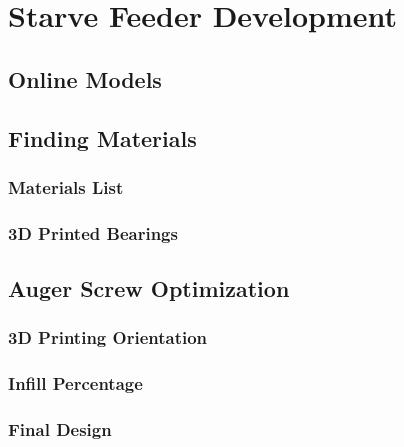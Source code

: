 \section{Starve Feeder Development\label{methedology:starveFeeder}}

\subsection{Online Models\label{sec:methedology:starveFeeder:onlineModels}}

\subsection{Finding Materials\label{sec:methedology:starveFeeder:findingMaterials}}

\subsubsection{Materials List\label{sec:methedology:starveFeeder:findingMaterials:materialsList}}

\subsubsection{3D Printed Bearings\label{sec:methedology:starveFeeder:findingMaterials:3dPrintedBearings}}

\subsection{Auger Screw Optimization\label{sec:methedology:starveFeeder:augerScrewOptimization}}

\subsubsection{3D Printing Orientation\label{sec:methedology:starveFeeder:augerScrewOptimization:3dPrintingOrientation}}

\subsubsection{Infill Percentage\label{sec:methedology:starveFeeder:augerScrewOptimization:infillPercentage}}

\subsubsection{Final Design\label{sec:methedology:starveFeeder:augerScrewOptimization:finalDesign}}

